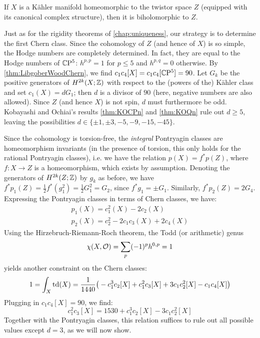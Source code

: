 \begin{thm}
	If $X$ is a K\"ahler manifold homeomorphic to the twistor space $Z$ (equipped with its canonical complex structure), then it is biholomorphic to $Z$.
\end{thm}
\begin{myproof}
	Just as for the rigidity theorems of \cref{chap:uniqueness}, our strategy is to determine the first Chern class. Since the cohomology of $Z$ (and hence of $X$) is so simple, the Hodge numbers are completely determined. In fact, they are equal to the Hodge numbers of $\mathbb{C}\mathrm{P}^5$: $h^{p,p}=1$ for $p\leq 5$ and $h^{p,q}=0$ otherwise. By \cref{thm:LibgoberWoodChern}, we find $c_1c_4[X]=c_1c_4[\mathbb{C}\mathrm{P}^5]=90$. Let $G_k$ be the positive generators of $H^{2k}(X;\mathbb{Z})$ with respect to the (powers of the) K\"ahler class and set $c_1(X)=d G_1$; then $d$ is a divisor of $90$ (here, negative numbers are also allowed). Since $Z$ (and hence $X$) is not spin, $d$ must furthermore be odd. Kobayashi and Ochiai's results \ref{thm:KOCPn} and \ref{thm:KOQn} rule out $d\geq 5$, leaving the possibilities $d\in\{\pm 1,\pm 3,-5,-9,-15,-45\}$.
	
	Since the cohomology is torsion-free, the \emph{integral} Pontryagin classes are homeomorphism invariants (in the presence of torsion, this only holds for the rational Pontryagin classes), i.e. we have the relation $p(X)=f^*p(Z)$, where $f:X\to Z$ is a homeomorphism, which exists by assumption. Denoting the generators of $H^{2k}(Z;\mathbb{Z})$ by $g_k$ as before, we have $f^*p_1(Z)=\frac{1}{2}f^*(g_1^2)=\frac{1}{2}G_1^2=G_2$, since $f^*g_1=\pm G_1$. Similarly, $f^*p_2(Z)=2G_4$. Expressing the Pontryagin classes in terms of Chern classes, we have:
	\begin{gather*}
		p_1(X)=c_1^2(X)-2c_2(X) \\
		p_2(X)=c_2^2-2c_1c_3(X)+2c_4(X)
	\end{gather*}
	Using the Hirzebruch-Riemann-Roch theorem, the Todd (or arithmetic) genus
	\begin{equation*}
		\chi(X,\mathcal{O})=\sum_p (-1)^p h^{0,p}=1
	\end{equation*} 
	yields another constraint on the Chern classes:
	\begin{equation*}
		1=\int_X\operatorname{td}(X)
		=\frac{1}{1440}\big(-c_1^3c_2[X]+c_1^2c_3[X]+3c_1c_2^2[X]-c_1c_4[X]\big)
	\end{equation*}
	Plugging in $c_1c_4[X]=90$, we find:
	\begin{equation*}
		c_1^2c_3[X]=1530+c_1^3c_2[X]-3c_1c_2^2[X]
	\end{equation*}
	Together with the Pontryagin classes, this relation suffices to rule out all possible values except $d=3$, as we will now show. 
	

\end{myproof}
